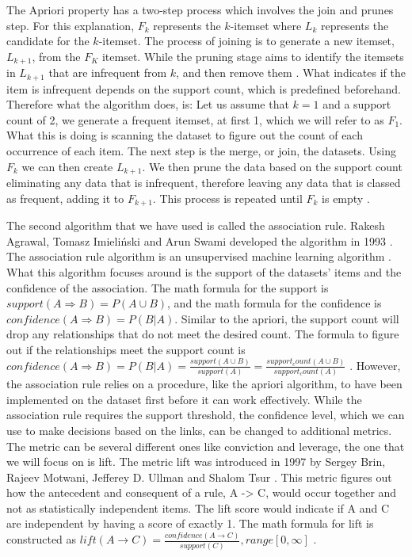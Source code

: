 \documentclass[a4paper,10pt]{article}
\begin{document}
The Apriori property has a two-step process which involves the join and prunes step. For this explanation, $F_k$ represents the $k$-itemset where $L_k$ represents the candidate for the $k$-itemset. The process of joining is to generate a new itemset, $L_{k+1}$, from the $F_K$ itemset. While the pruning stage aims to identify the itemsets in $L_{k+1}$ that are infrequent from $k$, and then remove them \cite{jingjingslides}. What indicates if the item is infrequent depends on the support count, which is predefined beforehand. Therefore what the algorithm does, is: Let us assume that $k=1$ and a support count of 2, we generate a frequent itemset, at first 1, which we will refer to as $F_1$. What this is doing is scanning the dataset to figure out the count of each occurrence of each item. The next step is the merge, or join, the datasets. Using $F_k$ we can then create $L_{k+1}$. We then prune the data based on the support count eliminating any data that is infrequent, therefore leaving any data that is classed as frequent, adding it to $F_{k+1}$. This process is repeated until $F_k$ is empty \cite{jingjingslides, han2011data}.

The second algorithm that we have used is called the association rule. Rakesh Agrawal, Tomasz Imieli{\'n}ski and Arun Swami developed the algorithm in 1993 \cite{agrawal1993mining}. The association rule algorithm is an unsupervised machine learning algorithm \cite{geron2019hands}. What this algorithm focuses around is the support of the datasets' items and the confidence of the association. The math formula for the support is $support(A \Rightarrow B) = P(A \cup B)$, and the math formula for the confidence is $confidence(A \Rightarrow B) = P(B|A)$.  Similar to the apriori, the support count will drop any relationships that do not meet the desired count. The formula to figure out if the relationships meet the support count is $confidence(A \Rightarrow B) = P(B|A) = \frac{support(A \cup B)}{support(A)} = \frac{support_count(A \cup B)}{support_count(A)}$ \cite{jingjingslides, han2011data}. However, the association rule relies on a procedure, like the apriori algorithm, to have been implemented on the dataset first before it can work effectively. While the association rule requires the support threshold, the confidence level, which we can use to make decisions based on the links, can be changed to additional metrics. The metric can be several different ones like conviction and leverage, the one that we will focus on is lift. The metric lift was introduced in 1997 by Sergey Brin, Rajeev Motwani, Jefferey D. Ullman and Shalom Tsur \cite{brin1997dynamic}. This metric figures out how the antecedent and consequent of a rule, A -> C, would occur together and not as statistically independent items. The lift score would indicate if A and C are independent by having a score of exactly 1. The math formula for lift is constructed as $lift(A \rightarrow C) = \frac{confidence(A \rightarrow C)}{support(C)}, range[0, \infty]$ \cite{brin1997dynamic, jingjingslides}.
\end{document}

